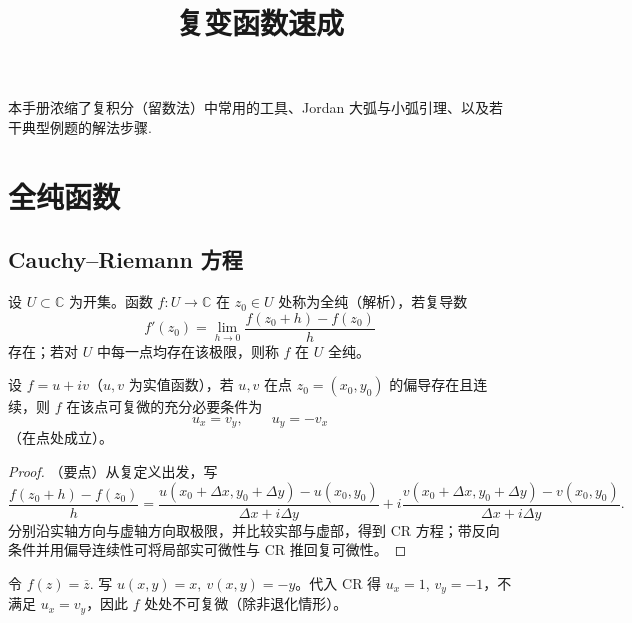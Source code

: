 \documentclass[lang=cn,10pt]{elegantbook}
\title{复变函数速成}
\begin{document}
	
	\maketitle
	\frontmatter
	
	\tableofcontents
	
	\mainmatter


		本手册浓缩了复积分（留数法）中常用的工具、Jordan 大弧与小弧引理、以及若干典型例题的解法步骤.
		
	\chapter{全纯函数}
	\section{Cauchy--Riemann 方程}
	
	\begin{theorem}[解析（全纯）函数的定义]
		设 \(U\subset\mathbb C\) 为开集。函数 \(f:U\to\mathbb C\) 在 \(z_0\in U\) 处称为全纯（解析），若复导数
		\[
		f'(z_0)=\lim_{h\to0}\frac{f(z_0+h)-f(z_0)}{h}
		\]
		存在；若对 \(U\) 中每一点均存在该极限，则称 \(f\) 在 \(U\) 全纯。
	\end{theorem}
	
	\begin{definition}
		设 \(f=u+iv\)（\(u,v\) 为实值函数），若 \(u,v\) 在点 \(z_0=(x_0,y_0)\) 的偏导存在且连续，则 \(f\) 在该点可复微的充分必要条件为
		\[
		u_x=v_y,\qquad u_y=-v_x
		\]
		（在点处成立）。
	\end{definition}
	
	\begin{proof}
		（要点）从复定义出发，写
		\[
		\frac{f(z_0+h)-f(z_0)}{h}=\frac{u(x_0+\Delta x,y_0+\Delta y)-u(x_0,y_0)}{\Delta x+i\Delta y}
		+i\frac{v(x_0+\Delta x,y_0+\Delta y)-v(x_0,y_0)}{\Delta x+i\Delta y}.
		\]
		分别沿实轴方向与虚轴方向取极限，并比较实部与虚部，得到 CR 方程；带反向条件并用偏导连续性可将局部实可微性与 CR 推回复可微性。
	\end{proof}
	
	\begin{example}
		令 \(f(z)=\overline z\). 写 \(u(x,y)=x,\ v(x,y)=-y\)。代入 CR 得 \(u_x=1\), \(v_y=-1\)，不满足 \(u_x=v_y\)，因此 \(f\) 处处不可复微（除非退化情形）。
	\end{example}
	
\end{document}
